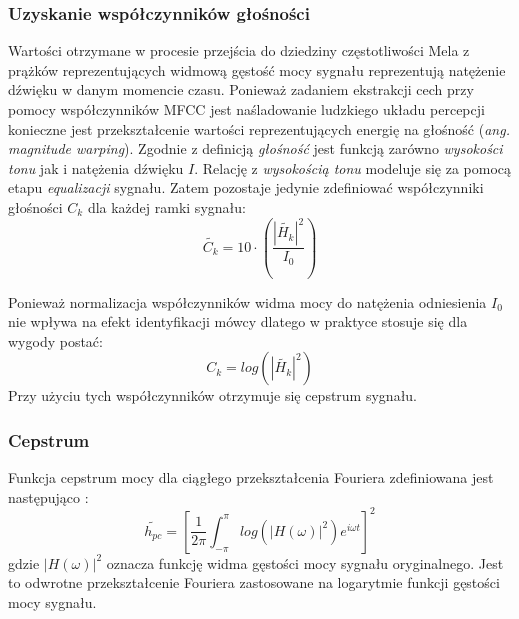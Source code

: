 \subsubsection{Uzyskanie współczynników głośności}
Wartości otrzymane w procesie przejścia do dziedziny częstotliwości Mela z prążków reprezentujących widmową gęstość mocy sygnału reprezentują natężenie dźwięku w danym momencie czasu. Ponieważ zadaniem ekstrakcji cech przy pomocy współczynników MFCC jest naśladowanie ludzkiego układu percepcji konieczne jest przekształcenie wartości reprezentujących energię na głośność (\textit{ang. magnitude warping}). Zgodnie z definicją  \textit{głośność} jest funkcją zarówno \textit{wysokości tonu} jak i natężenia dźwięku $I$. Relację z \textit{wysokością tonu} modeluje się za pomocą etapu \textit{equalizacji} sygnału. Zatem pozostaje jedynie zdefiniować współczynniki głośności $ C_k $ \cite{fosr} dla każdej ramki sygnału:
\begin{equation}
  \tilde{C_k} = 10 \cdot \left( \frac{|\tilde{H_k}|^2}{I_0} \right) 
\end{equation}

Ponieważ normalizacja współczynników widma mocy do natężenia odniesienia $I_0$ nie wpływa na efekt identyfikacji mówcy dlatego w praktyce stosuje się dla wygody postać: 
\begin{equation}
  C_k = log \left(|\tilde{H_k}|^2 \right)
\end{equation}
Przy użyciu tych współczynników otrzymuje się cepstrum sygnału.

\subsubsection{Cepstrum}
\label{cepstrum}

Funkcja cepstrum mocy dla ciągłego przekształcenia Fouriera zdefiniowana jest następująco \cite{fosr}:
\begin{equation}
    \tilde{h_{pc}} = \left[\frac{1}{2\pi}\int_{-\pi}^{\pi}log\left(| H(\omega)  |^2\right)e^{i \omega t}\right]^2
\end{equation}
gdzie $ |H(\omega)|^2 $ oznacza funkcję widma gęstości mocy sygnału oryginalnego. Jest to odwrotne przekształcenie Fouriera zastosowane na logarytmie funkcji gęstości mocy sygnału.
   
